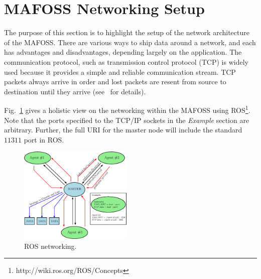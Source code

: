 \section{MAFOSS Networking Setup}
\label{sec:networking}
The purpose of this section is to highlight the setup of the network architecture of the MAFOSS. There are various ways to ship data around a network, and each has advantages and disadvantages, depending largely on the application. The communication protocol, such as  transmission control protocol (TCP)  is widely used because it provides a simple and reliable communication stream. TCP packets always arrive in order and lost packets are resent from source to destination until they arrive (see~\cite[Ch.~3]{Kurose2017} for details).

Fig.~\ref{fig:rosNetworkingExample} gives a holistic view on the networking within the MAFOSS using ROS\footnote{http://wiki.ros.org/ROS/Concepts}. Note that the ports specified to the TCP/IP sockets in the \emph{Example} section are arbitrary. Further, the full URI for the master node will include the standard $11311$ port in ROS. %
%
\begin{figure}
    \centering
    \includegraphics[width=0.48\textwidth]{figs/ipe/rosNetworkingExampleV2.eps}
    \caption{ROS networking.}
    \label{fig:rosNetworkingExample}
  \end{figure}
%  
